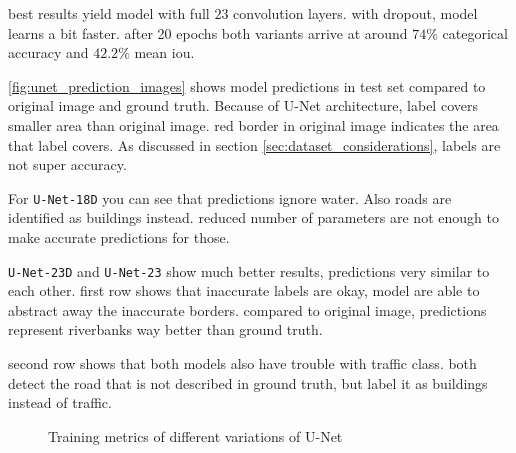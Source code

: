 {best results yield model with full $23$ convolution layers. with dropout, model learns a bit faster. after 20 epochs both variants arrive at around $74\%$ categorical accuracy and $42.2\%$ mean iou.

\ref{fig:unet_prediction_images} shows model predictions in test set compared to original image and ground truth. Because of U-Net architecture, label covers smaller area than original image. red border in original image indicates the area that label covers. As discussed in section \ref{sec:dataset_considerations}, labels are not super accuracy.

For \texttt{U-Net-18D} you can see that predictions ignore water. Also roads are identified as buildings instead. reduced number of parameters are not enough to make accurate predictions for those.

\texttt{U-Net-23D} and \texttt{U-Net-23} show much better results, predictions very similar to each other. first row shows that inaccurate labels are okay, model are able to abstract away the inaccurate borders. compared to original image, predictions represent riverbanks way better than ground truth.

second row shows that both models also have trouble with traffic class. both detect the road that is not described in ground truth, but label it as buildings instead of traffic.
}

\begin{figure}
    \newcommand{\UnetMetricsImageWidth}{0.32\textwidth}
    \centering
            
    \caption{Training metrics of different variations of U-Net}
    \label{fig:unet_train_metrics}
\end{figure}

